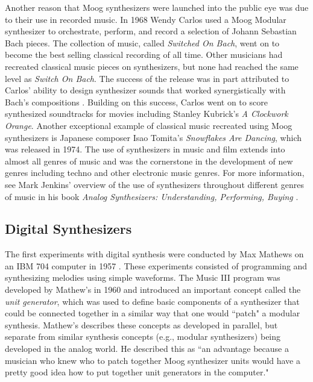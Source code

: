 Another reason that Moog synthesizers were launched into the public eye was due to  their use in recorded music. In 1968 Wendy Carlos used a Moog Modular synthesizer to orchestrate, perform, and record a selection of Johann Sebastian Bach pieces. The collection of music, called \textit{Switched On Bach}, went on to become the best selling classical recording of all time. Other musicians had recreated classical music pieces on synthesizers, but none had reached the same level as \textit{Switch On Bach}. The success of the release was in part attributed to Carlos' ability to design synthesizer sounds that worked synergistically with Bach's compositions \cite{jenkins2019analog}. Building on this success, Carlos went on to score synthesized soundtracks for movies including Stanley Kubrick's \textit{A Clockwork Orange}. Another exceptional example of classical music recreated using Moog synthesizers is Japanese composer Isao Tomita's \textit{Snowflakes Are Dancing}, which was released in 1974. The use of synthesizers in music and film extends into almost all genres of music and was the cornerstone in the development of new genres including techno and other electronic music genres. For more information, see Mark Jenkins' overview of the use of synthesizers throughout different genres of music in his book \textit{Analog Synthesizers: Understanding, Performing, Buying} \cite{jenkins2019analog}.

\subsection{Digital Synthesizers}
The first experiments with digital synthesis were conducted by Max Mathews on an IBM 704 computer in 1957 \cite{roads1980interview}. These experiments consisted of programming and synthesizing melodies using simple waveforms. The Music III program was developed by Mathew's in 1960 and introduced an important concept called the \textit{unit generator}, which was used to define basic components of a synthesizer that could be connected together in a similar way that one would ``patch" a modular synthesis. Mathew's describes these concepts as developed in parallel, but separate from similar synthesis concepts (e.g., modular synthesizers) being developed in the analog world. He described this as ``an advantage because a musician who knew who to patch together Moog synthesizer units would have a pretty good idea how to put together unit generators in the computer."

